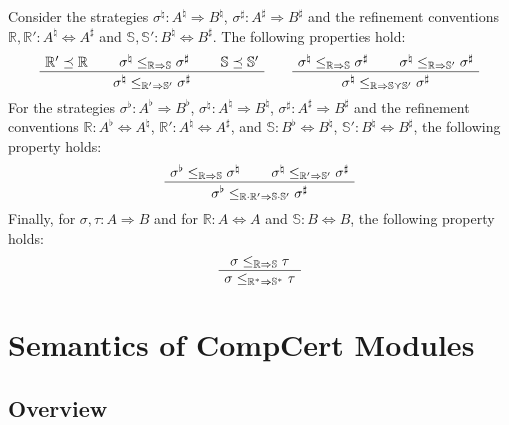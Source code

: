 \documentclass[acmsmall,timestamp,review,anonymous]{acmart}
\begin{document}
\begin{lemma} \label{lemma:kleenesim} %
Consider the strategies
$\sigma^\natural : A^\natural \Rightarrow B^\natural$,
$\sigma^\sharp : A^\sharp \Rightarrow B^\sharp$ and
the refinement conventions
$\mathbb{R}, \mathbb{R}' : A^\natural \Leftrightarrow A^\sharp$ and
$\mathbb{S}, \mathbb{S}' : B^\natural \Leftrightarrow B^\sharp$.
The following properties hold:
\[
  \AxiomC{$\mathbb{R}' \preceq \mathbb{R}$}
  \AxiomC{$\sigma^\natural \le_{\mathbb{R} \Rightarrow \mathbb{S}} \sigma^\sharp$}
  \AxiomC{$\mathbb{S} \preceq \mathbb{S}'$}
  \TrinaryInfC{$\sigma^\natural \le_{\mathbb{R}' \Rightarrow \mathbb{S}'} \sigma^\sharp$}
  \DisplayProof
  \qquad
  \AxiomC{$\sigma^\natural \le_{\mathbb{R} \Rightarrow \mathbb{S}} \sigma^\sharp$}
  \AxiomC{$\sigma^\natural \le_{\mathbb{R} \Rightarrow \mathbb{S}'} \sigma^\sharp$}
  \BinaryInfC{$\sigma^\natural
     \le_{\mathbb{R} \Rightarrow \mathbb{S} \curlyvee \mathbb{S}'} \sigma^\sharp$}
  \DisplayProof
\]
For the strategies
$\sigma^\flat : A^\flat \Rightarrow B^\flat$,
$\sigma^\natural : A^\natural \Rightarrow B^\natural$,
$\sigma^\sharp : A^\sharp \Rightarrow B^\sharp$ and
the refinement conventions
$\mathbb{R} : A^\flat \Leftrightarrow A^\natural$,
$\mathbb{R}' : A^\natural \Leftrightarrow A^\sharp$, and
$\mathbb{S} : B^\flat \Leftrightarrow B^\natural$,
$\mathbb{S}' : B^\natural \Leftrightarrow B^\sharp$,
the following property holds:
\[
  \AxiomC{$\sigma^\flat \le_{\mathbb{R} \Rightarrow \mathbb{S}} \sigma^\natural$}
  \AxiomC{$\sigma^\natural \le_{\mathbb{R}' \Rightarrow \mathbb{S}'} \sigma^\sharp$}
  \BinaryInfC{$\sigma^\flat
    \le_{\mathbb{R} \cdot \mathbb{R}' \Rightarrow \mathbb{S} \cdot \mathbb{S}'}
    \sigma^\sharp$}
  \DisplayProof
\]
Finally,
for
$\sigma, \tau : A \Rightarrow B$
and for
$\mathbb{R} : A \Leftrightarrow A$ and
$\mathbb{S} : B \Leftrightarrow B$,
the following property holds:
\[
  \AxiomC{$\sigma \le_{\mathbb{R} \Rightarrow \mathbb{S}} \tau$}
  \UnaryInfC{$\sigma \le_{\mathbb{R}^* \Rightarrow \mathbb{S}^*} \tau$}
  \DisplayProof
\]
\end{lemma}



\section{Semantics of CompCert Modules} \label{sec:modsem} %

\subsection{Overview} %
\end{document}
